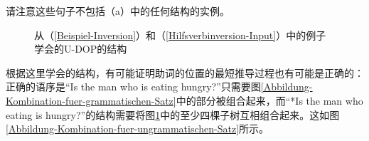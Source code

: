 \noindent
请注意这些句子不包括（a）中的任何结构的实例。
\begin{figure}
\hfill
{}
\hfill
{}
\hfill\mbox{}
\caption{\label{Abbildung-Strukturen-fuer-Fragen-und-RS}从（\ref{Beispiel-Inversion}）和（\ref{Hilfsverbinversion-Input}）中的例子学会的U-DOP的结构}
\end{figure}%
根据这里学会的结构，有可能证明助词的位置的最短推导过程也有可能是正确的：正确的语序是“Is the man who is eating
  hungry?”只需要图\vref{Abbildung-Kombination-fuer-grammatischen-Satz}中的部分被组合起来，而“*Is the man who eating is hungry?”的结构需要将图\ref{Abbildung-Strukturen-fuer-Fragen-und-RS}中的至少四棵子树互相组合起来。这如图\vref{Abbildung-Kombination-fuer-ungrammatischen-Satz}所示。

